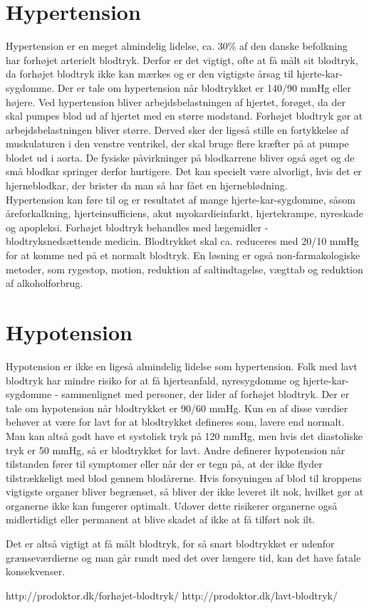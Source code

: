 \section{Hypertension} 
Hypertension er en meget almindelig lidelse, ca. 30\% af den danske befolkning har forhøjet arterielt blodtryk. Derfor er det vigtigt, ofte at få målt sit blodtryk, da forhøjet blodtryk ikke kan mærkes og er den vigtigste årsag til hjerte-kar-sygdomme. 
Der er tale om hypertension når blodtrykket er 140/90 mmHg eller højere.
Ved hypertension bliver arbejdsbelastningen af hjertet, forøget, da der skal pumpes blod ud af hjertet med en større modstand.
Forhøjet blodtryk gør at arbejdsbelastningen bliver større. Derved sker der ligeså stille en fortykkelse af muskulaturen i den venstre ventrikel, der skal bruge flere kræfter på at pumpe blodet ud i aorta. 
De fysiske påvirkninger på blodkarrene bliver også øget og de små blodkar springer derfor hurtigere. Det kan specielt være alvorligt, hvis det er hjerneblodkar, der brister da man så har fået en hjerneblødning. \\
Hypertension kan føre til og er resultatet af mange hjerte-kar-sygdomme, såsom åreforkalkning, hjerteinsufficiens, akut myokardieinfarkt, hjertekrampe, nyreskade og apopleksi.
Forhøjet blodtryk behandles med lægemidler - blodtryksnedsættende medicin. Blodtrykket skal ca. reduceres med 20/10 mmHg for at komme ned på et normalt blodtryk. En løsning er også non-farmakologiske metoder, som rygestop, motion, reduktion af saltindtagelse, vægttab og reduktion af alkoholforbrug. 

\section{Hypotension} 
Hypotension er ikke en ligeså almindelig lidelse som hypertension. Folk med lavt blodtryk har mindre risiko for at få hjerteanfald, nyresygdomme og hjerte-kar-sygdomme - sammenlignet med personer, der lider af forhøjet blodtryk.
Der er tale om hypotension når blodtrykket er 90/60 mmHg. Kun en af disse værdier behøver at være for lavt for at blodtrykket defineres som, lavere end normalt. Man kan altså godt have et systolisk tryk på 120 mmHg, men hvis det diastoliske tryk er 50 mmHg, så er blodtrykket for lavt.  
Andre definerer hypotension når tilstanden fører til symptomer eller når der er tegn på, at der ikke flyder tilstrækkeligt med blod gennem blodårerne. Hvis forsyningen af blod til kroppens vigtigste organer bliver begrænset, så bliver der ikke leveret ilt nok, hvilket gør at organerne ikke kan fungerer optimalt. Udover dette risikerer organerne også midlertidigt eller permanent at blive skadet af ikke at få tilført nok ilt. 

Det er altså vigtigt at få målt blodtryk, for så snart blodtrykket er udenfor grænseværdierne og man går rundt med det over længere tid, kan det have fatale konsekvenser.   


http://prodoktor.dk/forhøjet-blodtryk/
http://prodoktor.dk/lavt-blodtryk/ 


